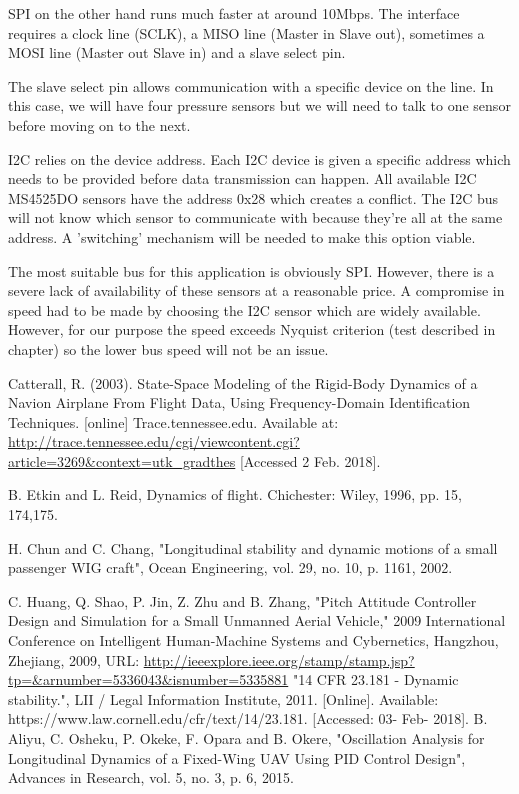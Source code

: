 \documentclass[
11pt, %
english, %
onehalfspacex, %
headsepline, %
] %
{MastersDoctoralThesis}
\renewcommand\bibname{References}
\begin{document}
SPI on the other hand runs much faster at around 10Mbps. The interface requires a clock line (SCLK), a MISO line (Master in Slave out), sometimes a MOSI line (Master out Slave in) and a slave select pin. 

The slave select pin allows communication with a specific device on the line. In this case, we will have four pressure sensors but we will need to talk to one sensor before moving on to the next. 

I2C relies on the device address. Each I2C device is given a specific address which needs to be provided before data transmission can happen. All available I2C MS4525DO sensors have the address 0x28 which creates a conflict. The I2C bus will not know which sensor to communicate with because they're all at the same address. A 'switching' mechanism will be needed to make this option viable. 

The most suitable bus for this application is obviously SPI. However, there is a severe lack of availability of these sensors at a reasonable price. A compromise in speed had to be made by choosing the I2C sensor which are widely available. However, for our purpose the speed exceeds Nyquist criterion (test described in chapter) so the lower bus speed will not be an issue. 
\thispagestyle{fancy}
\newpage
\renewcommand{\bibname}{References}
\begin{thebibliography}{9}
Catterall, R. (2003). State-Space Modeling of the Rigid-Body Dynamics of a Navion Airplane From Flight Data, Using Frequency-Domain Identification Techniques. [online] Trace.tennessee.edu. Available at: \url{http://trace.tennessee.edu/cgi/viewcontent.cgi?article=3269&context=utk_gradthes} [Accessed 2 Feb. 2018].
 

B. Etkin and L. Reid, Dynamics of flight. Chichester: Wiley, 1996, pp. 15, 174,175.
 
H. Chun and C. Chang, "Longitudinal stability and dynamic motions of a small passenger WIG craft", Ocean Engineering, vol. 29, no. 10, p. 1161, 2002.

C. Huang, Q. Shao, P. Jin, Z. Zhu and B. Zhang, "Pitch Attitude Controller Design and Simulation for a Small Unmanned Aerial Vehicle," 2009 International Conference on Intelligent Human-Machine Systems and Cybernetics, Hangzhou, Zhejiang, 2009, 
URL: \url{http://ieeexplore.ieee.org/stamp/stamp.jsp?tp=&arnumber=5336043&isnumber=5335881}
"14 CFR 23.181 - Dynamic stability.", LII / Legal Information Institute, 2011. [Online]. Available: https://www.law.cornell.edu/cfr/text/14/23.181. [Accessed: 03- Feb- 2018].
B. Aliyu, C. Osheku, P. Okeke, F. Opara and B. Okere, "Oscillation Analysis for Longitudinal Dynamics of a Fixed-Wing UAV Using PID Control Design", Advances in Research, vol. 5, no. 3, p. 6, 2015.
\end{thebibliography}
\end{document}
